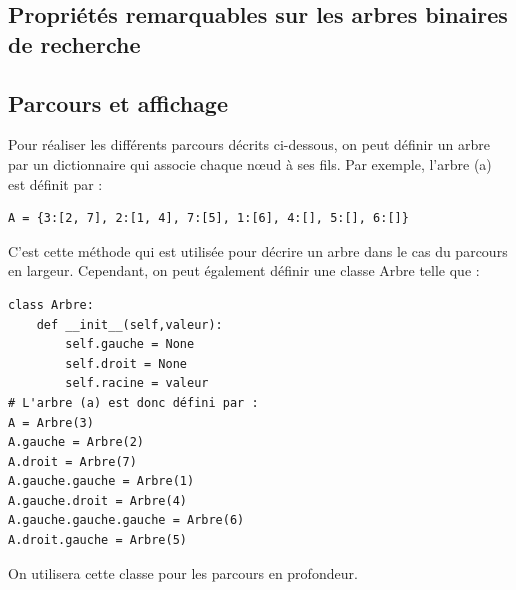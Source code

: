 \documentclass{report}
\begin{document}
\subsection{Propriétés remarquables sur les arbres binaires de recherche}

\subsection{Parcours et affichage}

Pour réaliser les différents parcours décrits ci-dessous, on peut définir un arbre par un dictionnaire qui associe chaque nœud à ses fils. Par exemple, l'arbre (a) est définit par :
\begin{lstlisting}
A = {3:[2, 7], 2:[1, 4], 7:[5], 1:[6], 4:[], 5:[], 6:[]}
\end{lstlisting}
C'est cette méthode qui est utilisée pour décrire un arbre dans le cas du parcours en largeur. Cependant, on peut également définir une classe Arbre telle que :
\begin{lstlisting}
class Arbre: 
    def __init__(self,valeur): 
        self.gauche = None
        self.droit = None
        self.racine = valeur
# L'arbre (a) est donc défini par :
A = Arbre(3) 
A.gauche = Arbre(2) 
A.droit = Arbre(7) 
A.gauche.gauche = Arbre(1) 
A.gauche.droit = Arbre(4)
A.gauche.gauche.gauche = Arbre(6)
A.droit.gauche = Arbre(5)
\end{lstlisting}
On utilisera cette classe pour les parcours en profondeur.
\end{document}
